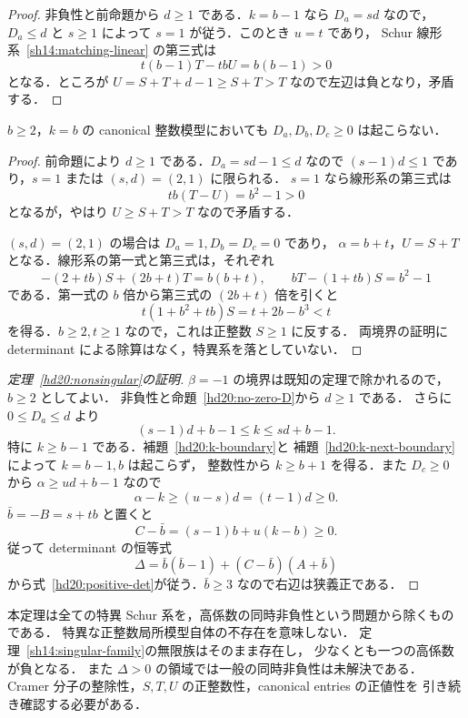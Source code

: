 \begin{proof}
非負性と前命題から $d\ge1$ である．$k=b-1$ なら $D_a=sd$ なので，
$D_a\le d$ と $s\ge1$ によって $s=1$ が従う．このとき $u=t$ であり，
Schur 線形系~\eqref{sh14:matching-linear} の第三式は
\[
 t(b-1)T-tbU=b(b-1)>0
\]
となる．ところが $U=S+T+d-1\ge S+T>T$ なので左辺は負となり，矛盾する．
\end{proof}

\begin{lemma}[隣接する境界の排除]
\label{hd20:k-next-boundary}
$b\ge2$，$k=b$ の canonical 整数模型においても
$D_a,D_b,D_c\ge0$ は起こらない．
\end{lemma}

\begin{proof}
前命題により $d\ge1$ である．$D_a=sd-1\le d$ なので
$(s-1)d\le1$ であり，$s=1$ または $(s,d)=(2,1)$ に限られる．
$s=1$ なら線形系の第三式は
\[
 tb(T-U)=b^2-1>0
\]
となるが，やはり $U\ge S+T>T$ なので矛盾する．

$(s,d)=(2,1)$ の場合は $D_a=1,D_b=D_c=0$ であり，
$\alpha=b+t$，$U=S+T$ となる．線形系の第一式と第三式は，それぞれ
\[
 -(2+tb)S+(2b+t)T=b(b+t),
 \qquad bT-(1+tb)S=b^2-1
\]
である．第一式の $b$ 倍から第三式の $(2b+t)$ 倍を引くと
\[
 t(1+b^2+tb)S=t+2b-b^3<t
\]
を得る．$b\ge2,t\ge1$ なので，これは正整数 $S\ge1$ に反する．
両境界の証明に determinant による除算はなく，特異系を落としていない．
\end{proof}

\begin{proof}[定理~\ref{hd20:nonsingular}の証明]
$\beta=-1$ の境界は既知の定理で除かれるので，$b\ge2$ としてよい．
非負性と命題~\ref{hd20:no-zero-D}から $d\ge1$ である．
さらに $0\le D_a\le d$ より
\[
 (s-1)d+b-1\le k\le sd+b-1.
\]
特に $k\ge b-1$ である．補題~\ref{hd20:k-boundary}と
補題~\ref{hd20:k-next-boundary}によって $k=b-1,b$ は起こらず，
整数性から $k\ge b+1$ を得る．また $D_c\ge0$ から
$\alpha\ge ud+b-1$ なので
\[
 \alpha-k\ge(u-s)d=(t-1)d\ge0.
\]
$\bar b=-B=s+tb$ と置くと
\[
 C-\bar b=(s-1)b+u(k-b)\ge0.
\]
従って determinant の恒等式
\[
 \Delta=\bar b(\bar b-1)+(C-\bar b)(A+\bar b)
\]
から式~\eqref{hd20:positive-det}が従う．$\bar b\ge3$ なので右辺は狭義正である．
\end{proof}

\begin{remark}[残る非特異領域の量化]
\label{hd20:remaining}
本定理は全ての特異 Schur 系を，高係数の同時非負性という問題から除くものである．
特異な正整数局所模型自体の不存在を意味しない．
定理~\ref{sh14:singular-family}の無限族はそのまま存在し，
少なくとも一つの高係数が負となる．
また $\Delta>0$ の領域では一般の同時非負性は未解決である．
Cramer 分子の整除性，$S,T,U$ の正整数性，canonical entries の正値性を
引き続き確認する必要がある．
\end{remark}

